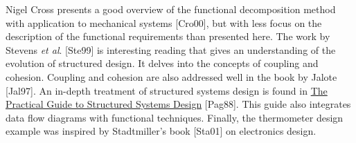 Nigel Cross presents a good overview of the functional decomposition
method with application to mechanical systems {[}Cro00{]}, but with less
focus on the description of the functional requirements than presented
here. The work by Stevens \emph{et al}. {[}Ste99{]} is interesting
reading that gives an understanding of the evolution of structured
design. It delves into the concepts of coupling and cohesion. Coupling
and cohesion are also addressed well in the book by Jalote {[}Jal97{]}.
An in-depth treatment of structured systems design is found in \ul{The
Practical Guide to Structured Systems Design} {[}Pag88{]}. This guide
also integrates data flow diagrams with functional techniques. Finally,
the thermometer design example was inspired by Stadtmiller's book
{[}Sta01{]} on electronics design.
